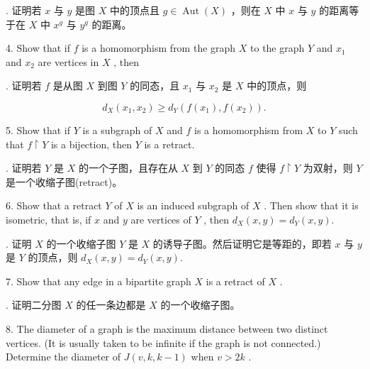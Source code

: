 \documentclass[10pt]{article}
\begin{document}
\begin{tcolorbox}. 证明若 \(x\) 与 \(y\) 是图 \(X\) 中的顶点且 \(g \in  \operatorname{Aut}\left( X\right)\) ，则在 \(X\) 中 \(x\) 与 \(y\) 的距离等于在 \(X\) 中 \({x}^{g}\) 与 \({y}^{g}\) 的距离。
\end{tcolorbox}

4. Show that if \(f\) is a homomorphism from the graph \(X\) to the graph \(Y\) and \({x}_{1}\) and \({x}_{2}\) are vertices in \(X\) , then

\begin{tcolorbox}. 证明若 \(f\) 是从图 \(X\) 到图 \(Y\) 的同态，且 \({x}_{1}\) 与 \({x}_{2}\) 是 \(X\) 中的顶点，则
\end{tcolorbox}

\[
{d}_{X}\left( {{x}_{1},{x}_{2}}\right)  \geq  {d}_{Y}\left( {f\left( {x}_{1}\right) ,f\left( {x}_{2}\right) }\right) .
\]

5. Show that if \(Y\) is a subgraph of \(X\) and \(f\) is a homomorphism from \(X\) to \(Y\) such that \(f \upharpoonright  Y\) is a bijection, then \(Y\) is a retract.

\begin{tcolorbox}. 证明若 \(Y\) 是 \(X\) 的一个子图，且存在从 \(X\) 到 \(Y\) 的同态 \(f\) 使得 \(f \upharpoonright  Y\) 为双射，则 \(Y\) 是一个收缩子图(retract)。
\end{tcolorbox}

6. Show that a retract \(Y\) of \(X\) is an induced subgraph of \(X\) . Then show that it is isometric, that is, if \(x\) and \(y\) are vertices of \(Y\) , then \({d}_{X}\left( {x,y}\right)  = {d}_{Y}\left( {x,y}\right) .\)

\begin{tcolorbox}. 证明 \(X\) 的一个收缩子图 \(Y\) 是 \(X\) 的诱导子图。然后证明它是等距的，即若 \(x\) 与 \(y\) 是 \(Y\) 的顶点，则 \({d}_{X}\left( {x,y}\right)  = {d}_{Y}\left( {x,y}\right) .\)
\end{tcolorbox}

7. Show that any edge in a bipartite graph \(X\) is a retract of \(X\) .

\begin{tcolorbox}. 证明二分图 \(X\) 的任一条边都是 \(X\) 的一个收缩子图。
\end{tcolorbox}

8. The diameter of a graph is the maximum distance between two distinct vertices. (It is usually taken to be infinite if the graph is not connected.) Determine the diameter of \(J\left( {v,k,k - 1}\right)\) when \(v > {2k}\) .
\end{document}

